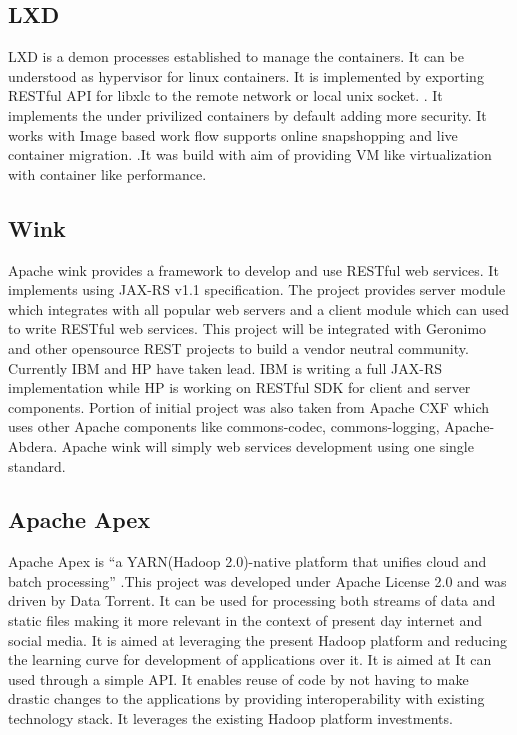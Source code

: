 \subsection{ LXD}

     LXD is a  demon processes established to manage the
     containers. It can be understood as hypervisor for linux
     containers. It is implemented by exporting RESTful API for libxlc
     to the remote network or local unix
     socket. \cite{www-lxd-thevarguy}. It implements the under
     privilized containers by default adding more security. It works
     with Image based work flow supports online snapshopping and live
     container migration. \cite{www-lxd-lists-linux}.It was build
     with aim of providing VM like virtualization with container like
     performance. \cite{www-lxd-ubuntu}

\subsection{ Wink}

     Apache wink \cite{www-apache-wink} provides a framework to
     develop and use RESTful web services. It implements using JAX-RS
     v1.1 specification. The project provides server module which
     integrates with all popular web servers and a client module which
     can used to write RESTful web services. This project will be
     integrated with Geronimo and other opensource REST projects to
     build a vendor neutral community. Currently IBM and HP have taken
     lead. IBM is writing a full JAX-RS implementation while HP is
     working on RESTful SDK for client and server components.  Portion
     of initial project was also taken from Apache CXF which uses
     other Apache components like commons-codec, commons-logging,
     Apache-Abdera. Apache wink will simply web services development
     using one single standard.

\subsection{ Apache Apex}
     
     Apache Apex is ``a YARN(Hadoop 2.0)-native platform that unifies
     cloud and batch processing'' \cite{www-apacheapexwiki}.This
     project was developed under Apache License 2.0 and was driven by
     Data Torrent. It can be used for processing both streams of data
     and static files making it more relevant in the context of
     present day internet and social media. It is aimed at leveraging
     the present Hadoop platform and reducing the learning curve for
     development of applications over it. It is aimed at It can used
     through a simple API. It enables reuse of code by not having to
     make drastic changes to the applications by providing
     interoperability with existing technology stack. It leverages the
     existing Hadoop platform investments.

